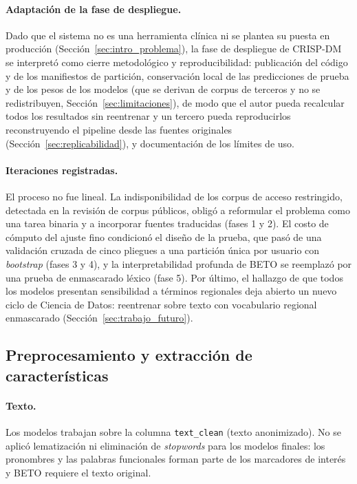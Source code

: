 \documentclass[12pt,a4paper]{article}
\begin{document}
\paragraph{Adaptación de la fase de despliegue.} Dado que el sistema no es una herramienta clínica ni se plantea su puesta en producción (Sección~\ref{sec:intro_problema}), la fase de despliegue de CRISP-DM se interpretó como cierre metodológico y reproducibilidad: publicación del código y de los manifiestos de partición, conservación local de las predicciones de prueba y de los pesos de los modelos (que se derivan de corpus de terceros y no se redistribuyen, Sección~\ref{sec:limitaciones}), de modo que el autor pueda recalcular todos los resultados sin reentrenar y un tercero pueda reproducirlos reconstruyendo el pipeline desde las fuentes originales (Sección~\ref{sec:replicabilidad}), y documentación de los límites de uso.

\paragraph{Iteraciones registradas.} El proceso no fue lineal. La indisponibilidad de los corpus de acceso restringido, detectada en la revisión de corpus públicos, obligó a reformular el problema como una tarea binaria y a incorporar fuentes traducidas (fases 1 y 2). El costo de cómputo del ajuste fino condicionó el diseño de la prueba, que pasó de una validación cruzada de cinco pliegues a una partición única por usuario con \emph{bootstrap} (fases 3 y 4), y la interpretabilidad profunda de BETO se reemplazó por una prueba de enmascarado léxico (fase 5). Por último, el hallazgo de que todos los modelos presentan sensibilidad a términos regionales deja abierto un nuevo ciclo de Ciencia de Datos: reentrenar sobre texto con vocabulario regional enmascarado (Sección~\ref{sec:trabajo_futuro}).

\subsection{Preprocesamiento y extracción de características}
\label{sec:preprocesamiento}
\paragraph{Texto.} Los modelos trabajan sobre la columna \texttt{text\_clean} (texto anonimizado). No se aplicó lematización ni eliminación de \emph{stopwords} para los modelos finales: los pronombres y las palabras funcionales forman parte de los marcadores de interés y BETO requiere el texto original.
\end{document}
